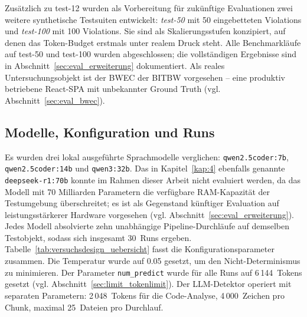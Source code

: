 Zusätzlich zu test-12 wurden als Vorbereitung für zukünftige Evaluationen zwei weitere synthetische Testsuiten entwickelt: \textit{test-50} mit 50 eingebetteten Violations und \textit{test-100} mit 100 Violations. Sie sind als Skalierungsstufen konzipiert, auf denen das Token-Budget erstmals unter realem Druck steht. Alle Benchmarkläufe auf test-50 und test-100 wurden abgeschlossen; die vollständigen Ergebnisse sind in Abschnitt~\ref{sec:eval_erweiterung} dokumentiert. Als reales Untersuchungsobjekt ist der \ac{BWEC} der \ac{BITBW} vorgesehen -- eine produktiv betriebene React-\ac{SPA} mit unbekannter Ground Truth (vgl. Abschnitt~\ref{sec:eval_bwec}).

\subsection{Modelle, Konfiguration und Runs}
\label{sec:versuch_modelle}

Es wurden drei lokal ausgeführte Sprachmodelle verglichen: \texttt{qwen2.5\-coder:7b}, \texttt{qwen2.5\-coder:14b} und \texttt{qwen3:32b}. Das in Kapitel~\ref{kap:4} ebenfalls genannte \texttt{deepseek-r1:70b} konnte im Rahmen dieser Arbeit nicht evaluiert werden, da das Modell mit 70 Milliarden Parametern die verfügbare \ac{RAM}-Kapazität der Testumgebung überschreitet; es ist als Gegenstand künftiger Evaluation auf leistungsstärkerer Hardware vorgesehen (vgl. Abschnitt~\ref{sec:eval_erweiterung}). Jedes Modell absolvierte zehn unabhängige Pipeline-Durchläufe auf demselben Testobjekt, sodass sich insgesamt 30~Runs ergeben. Tabelle~\ref{tab:versuchsdesign_uebersicht} fasst die Konfigurationsparameter zusammen. Die Temperatur wurde auf 0.05 gesetzt, um den Nicht-Determinismus zu minimieren. Der Parameter \texttt{num\_predict} wurde für alle Runs auf 6\,144~Tokens gesetzt (vgl. Abschnitt~\ref{sec:limit_tokenlimit}). Der \ac{LLM}-Detektor operiert mit separaten Parametern: 2\,048~Tokens für die Code-Analyse, 4\,000~Zeichen pro Chunk, maximal 25~Dateien pro Durchlauf.

